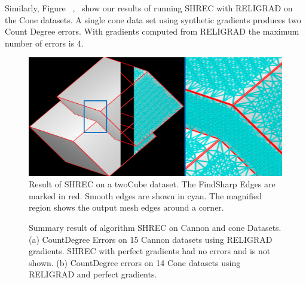 Similarly, Figure ~\protect{},~\protect{} show our results of running SHREC with RELIGRAD on the Cone datasets.
A single cone data set using synthetic gradients produces two Count Degree errors. With gradients computed from RELIGRAD the maximum number of errors is 4.
\begin{figure}[tb]
	\includegraphics[width=\linewidth]{images/shrecperfect.eps}
	\caption{Result of SHREC on a twoCube dataset. The FindSharp Edges are marked in red. Smooth edges are shown in cyan. The magnified region shows the output mesh edges around a corner.}
	\label{fig:shrecPerfect1}
\end{figure}
\begin{figure}[tb]
	\caption{Summary result of algorithm SHREC on Cannon and cone Datasets. (a) CountDegree Errors on 15 Cannon datasets using RELIGRAD gradients. SHREC with perfect gradients had no errors and is not shown. (b) CountDegree errors on 14 Cone datasets using RELIGRAD and perfect gradients.}
	\label{fig:cannon_cone_summary}
\end{figure}
